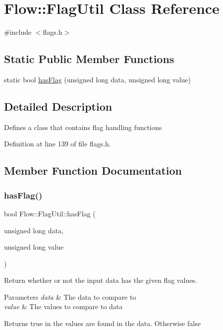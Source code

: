 \hypertarget{class_flow_1_1_flag_util}{}\section{Flow\+:\+:Flag\+Util Class Reference}
\label{class_flow_1_1_flag_util}


{\ttfamily \#include $<$flags.\+h$>$}

\subsection*{Static Public Member Functions}
\begin{DoxyCompactItemize}
\item 
static bool \hyperlink{class_flow_1_1_flag_util_a93a835f63abb37958e39b5822b4d8b7a}{has\+Flag} (unsigned long data, unsigned long value)
\end{DoxyCompactItemize}


\subsection{Detailed Description}
Defines a class that contains flag handling functions 

Definition at line 139 of file flags.\+h.



\subsection{Member Function Documentation}
\hypertarget{class_flow_1_1_flag_util_a93a835f63abb37958e39b5822b4d8b7a}{}\label{class_flow_1_1_flag_util_a93a835f63abb37958e39b5822b4d8b7a} 
\subsubsection{\texorpdfstring{has\+Flag()}{hasFlag()}}
{\footnotesize\ttfamily bool Flow\+::\+Flag\+Util\+::has\+Flag (\begin{DoxyParamCaption}\item[{unsigned long}]{data,  }\item[{unsigned long}]{value }\end{DoxyParamCaption})\hspace{0.3cm}{\ttfamily [static]}}

Return whether or not the input data has the given flag values. 
\begin{DoxyParams}{Parameters}
{\em data} & The data to compare to \\
\hline
{\em value} & The values to compare to data \\
\hline
\end{DoxyParams}
\begin{DoxyReturn}{Returns}
true in the values are found in the data. Otherwise false 
\end{DoxyReturn}


